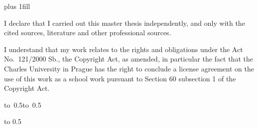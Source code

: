 \newpage



\openright
\hypersetup{pageanchor=true}
\pagestyle{plain}
\vglue 0pt plus 1fill

\noindent
I declare that I carried out this master thesis independently, and only with the cited
sources, literature and other professional sources.

\medskip\noindent
I understand that my work relates to the rights and obligations under the Act No.~121/2000 Sb.,
the Copyright Act, as amended, in particular the fact that the Charles
University in Prague has the right to conclude a license agreement on the use of this
work as a school work pursuant to Section 60 subsection 1 of the Copyright Act.

\vspace{10mm}

\hbox{\hbox to 0.5\hbox to 0.5}

\vspace{20mm}
\newpage


\openright

\vbox to 0.5

\newpage


\openright

\noindent
\Dedication

\newpage

\openright
\pagestyle{plain}
\setcounter{page}{1}
